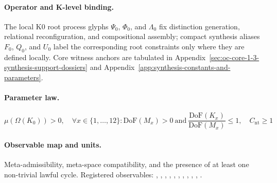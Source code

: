 \paragraph{Operator and K-level binding.}
The local K0 root process glyphs \(\Psi_0\), \(\Phi_0\), and \(\Lambda_0\) fix distinction generation, relational reconfiguration, and compositional assembly; compact synthesis aliases \(F_0\), \(Q_0\), and \(U_0\) label the corresponding root constraints only where they are defined locally.
Core witness anchors are tabulated in Appendix~\ref{sec:oc-core-1-3-synthesis-support-dossiers} and Appendix~\ref{app:synthesis-constants-and-parameters}.

\paragraph{Parameter law.}
\[
\mu(\Omega(K_0)) > 0,\quad \forall x \in \{1,\dots,12\}: \mathrm{DoF}(M_x)>0\ \mathrm{and}\ \frac{\mathrm{DoF}(K_x)}{\mathrm{DoF}(M_x)} \leq 1,\quad C_{\mathrm{nt}} \geq 1
\]

\paragraph{Observable map and units.}
Meta-admissibility, meta-space compatibility, and the presence of at least one non-trivial lawful cycle.
Registered observables: , \allowbreak {}, \allowbreak {}, \allowbreak {}, \allowbreak {}, \allowbreak {}, \allowbreak {}, \allowbreak {}, \allowbreak {}, \allowbreak {}, \allowbreak {}.

